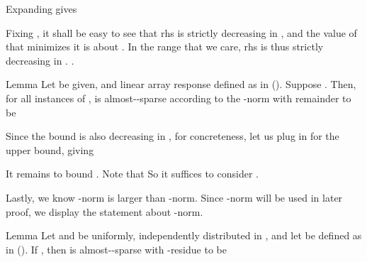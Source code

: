 Expanding  gives

Fixing , it shall be easy to see that rhs is strictly decreasing in , and the value of  that minimizes it is about .
In the range that we care, rhs is thus strictly decreasing in .
.

\Result
{Lemma}
{
Let  be given, and linear array response  defined as in ().
Suppose .
Then, for all instances of \m {\f},  is almost--sparse according to the -norm with remainder  to be
}

Since the bound is also decreasing in , for concreteness, let us plug in  for the upper bound, giving

\stopsection

\startsection [title={Almost-Sparsity of Channel Response \m {\M{H}}}]

It remains to bound .
Note that
So it suffices to consider .

Lastly, we know -norm is larger than -norm.
Since -norm will be used in later proof, we display the statement about -norm.

\Result
{Lemma}
{
Let  and  be uniformly, independently distributed in \m {[0,2\pi)}, and let  be defined as in ().
If , then  is almost--sparse with -residue  to be
}

\stopsection

\startsection [title={Moments of Precoders' and Combiners' entries}]

